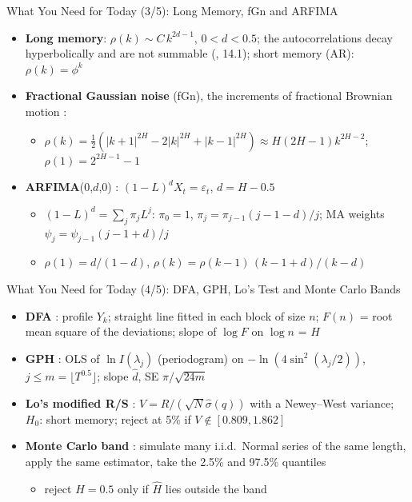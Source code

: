 \begin{frame}{What You Need for Today (3/5): Long Memory, fGn and ARFIMA}
\itemsize{\footnotesize}
\begin{itemize}
    \item \textbf{Long memory}: $\rho(k) \sim C\,k^{2d - 1}$, $0 < d < 0.5$; the autocorrelations decay hyperbolically and are not summable (, 14.1); short memory (AR): $\rho(k) = \phi^k$
    \item \textbf{Fractional Gaussian noise} (fGn), the increments of fractional Brownian motion :
    \begin{itemize}
        \item $\rho(k) = \tfrac12\left(|k + 1|^{2H} - 2|k|^{2H} + |k - 1|^{2H}\right) \approx H(2H - 1)k^{2H - 2}$; $\rho(1) = 2^{2H - 1} - 1$
    \end{itemize}
    \item \textbf{ARFIMA}(0,$d$,0) : $(1 - L)^d X_t = \varepsilon_t$, $d = H - 0.5$
    \begin{itemize}
        \item $(1 - L)^d = \sum_j \pi_j L^j$: $\pi_0 = 1$, $\pi_j = \pi_{j-1}(j - 1 - d)/j$; MA weights $\psi_j = \psi_{j-1}(j - 1 + d)/j$
        \item $\rho(1) = d/(1 - d)$, $\rho(k) = \rho(k - 1)\,(k - 1 + d)/(k - d)$
    \end{itemize}
\end{itemize}
\end{frame}

\begin{frame}{What You Need for Today (4/5): DFA, GPH, Lo's Test and Monte Carlo Bands}
\itemsize{\footnotesize}
\begin{itemize}
    \item \textbf{DFA} : profile $Y_k$; straight line fitted in each block of size $n$; $F(n)$ = root mean square of the deviations; slope of $\log F$ on $\log n$ = $\hat H$
    \item \textbf{GPH} : OLS of $\ln I(\lambda_j)$ (periodogram) on $-\ln(4\sin^2(\lambda_j/2))$, $j \le m = \lfloor T^{0.5}\rfloor$; slope $\hat d$, SE $\pi/\sqrt{24m}$
    \item \textbf{Lo's modified R/S} : $V = R/(\sqrt{N}\hat\sigma(q))$ with a Newey--West variance; $H_0$: short memory; reject at 5\% if $V \notin [0.809, 1.862]$
    \item \textbf{Monte Carlo band} : simulate many i.i.d.\ Normal series of the same length, apply the same estimator, take the 2.5\% and 97.5\% quantiles
    \begin{itemize}
        \item reject $H = 0.5$ only if $\hat H$ lies outside the band
    \end{itemize}
\end{itemize}
\end{frame}

